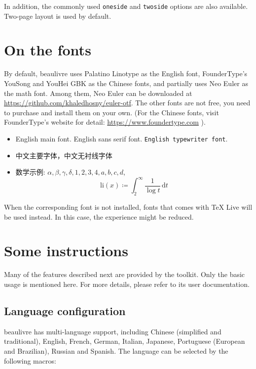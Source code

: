 \documentclass[allowbf]{beaulivre}
\newenvironment{tip}[1][Tip]{%
    \begin{tcolorbox}[breakable,
        enhanced,
        width = \textwidth,
        colback = paper, colbacktitle = paper,
        colframe = gray!50, boxrule=0.2mm,
        coltitle = black,
        fonttitle = \sffamily,
        attach boxed title to top left = {yshift=-\tcboxedtitleheight/2, xshift=.5cm},
        boxed title style = {boxrule=0pt, colframe=paper},
        before skip = 0.3cm,
        after skip = 0.3cm,
        top = 3mm,
        bottom = 3mm,
        title={\scshape\sffamily #1}]%
}{\end{tcolorbox}}
\providecommand{\beaulivre}{{\normalfont\textsf{beaulivre}}}
\begin{document}
\bigskip
In addition, the commonly used \texttt{oneside} and \texttt{twoside} options are also available. Two-page layout is used by default.

\chapter{On the fonts}
By default, \beaulivre{} uses Palatino Linotype as the English font, FounderType's YouSong and YouHei GBK as the Chinese fonts, and partially uses Neo Euler as the math font. Among them, Neo Euler can be downloaded at \url{https://github.com/khaledhosny/euler-otf}. The other fonts are not free, you need to purchase and install them on your own. (For the Chinese fonts, visit FounderType's website for detail: \url{https://www.foundertype.com} ).

\medskip
\begin{tip}[Font demonstration]
    \begin{itemize}
        \item English main font. \textsf{English sans serif font}. \texttt{English typewriter font}.
        \item 中文主要字体，\textsf{中文无衬线字体}
        \item 数学示例:  \( \alpha, \beta, \gamma, \delta, 1,2,3,4, a,b,c,d \), \[\mathrm{li}(x)\coloneqq \int_2^{\infty} \frac{1}{\log t}\,\mathrm{d}t \]
    \end{itemize}
\end{tip}

\bigskip
When the corresponding font is not installed, fonts that comes with TeX Live will be used instead. In this case, the experience might be reduced.


\chapter{Some instructions}

Many of the features described next are provided by the \ProjLib{} toolkit. Only the basic usage is mentioned here. For more details, please refer to its user documentation.

\section{Language configuration}

\beaulivre{} has multi-language support, including Chinese (simplified and traditional), English, French, German, Italian, Japanese, Portuguese (European and Brazilian), Russian and Spanish. The language can be selected by the following macros:
\end{document}
